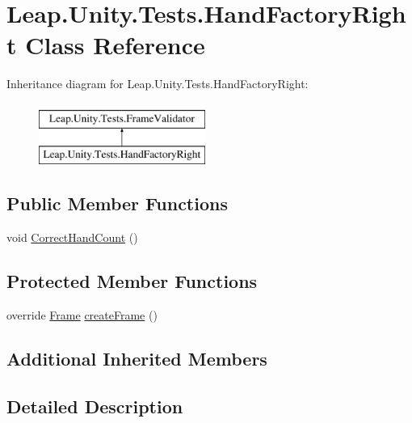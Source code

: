 \hypertarget{class_leap_1_1_unity_1_1_tests_1_1_hand_factory_right}{}\section{Leap.\+Unity.\+Tests.\+Hand\+Factory\+Right Class Reference}
\label{class_leap_1_1_unity_1_1_tests_1_1_hand_factory_right}
Inheritance diagram for Leap.\+Unity.\+Tests.\+Hand\+Factory\+Right\+:\begin{figure}[H]
\begin{center}
\leavevmode
\includegraphics[height=2.000000cm]{class_leap_1_1_unity_1_1_tests_1_1_hand_factory_right}
\end{center}
\end{figure}
\subsection*{Public Member Functions}
\begin{DoxyCompactItemize}
\item 
void \mbox{\hyperlink{class_leap_1_1_unity_1_1_tests_1_1_hand_factory_right_a96faa3acb560751fb8c44712666b111a}{Correct\+Hand\+Count}} ()
\end{DoxyCompactItemize}
\subsection*{Protected Member Functions}
\begin{DoxyCompactItemize}
\item 
override \mbox{\hyperlink{class_leap_1_1_frame}{Frame}} \mbox{\hyperlink{class_leap_1_1_unity_1_1_tests_1_1_hand_factory_right_a78c8a9a73c6c7e18c0eb8890e39d64b5}{create\+Frame}} ()
\end{DoxyCompactItemize}
\subsection*{Additional Inherited Members}


\subsection{Detailed Description}


